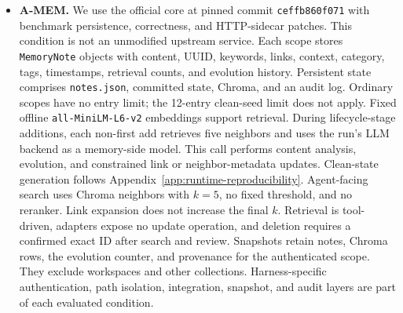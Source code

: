 \documentclass[letterpaper]{article}
\begin{document}
\begin{itemize}
    \item \textbf{A-MEM.} We use the official core at pinned commit \texttt{ceffb860f071} with benchmark persistence, correctness, and HTTP-sidecar patches. This condition is not an unmodified upstream service. Each scope stores \texttt{MemoryNote} objects with content, UUID, keywords, links, context, category, tags, timestamps, retrieval counts, and evolution history. Persistent state comprises \texttt{notes.json}, committed state, Chroma, and an audit log. Ordinary scopes have no entry limit; the 12-entry clean-seed limit does not apply. Fixed offline \texttt{all-MiniLM-L6-v2} embeddings support retrieval. During lifecycle-stage additions, each non-first add retrieves five neighbors and uses the run's LLM backend as a memory-side model. This call performs content analysis, evolution, and constrained link or neighbor-metadata updates. Clean-state generation follows Appendix~\ref{app:runtime-reproducibility}. Agent-facing search uses Chroma neighbors with \(k=5\), no fixed threshold, and no reranker. Link expansion does not increase the final \(k\). Retrieval is tool-driven, adapters expose no update operation, and deletion requires a confirmed exact ID after search and review. Snapshots retain notes, Chroma rows, the evolution counter, and provenance for the authenticated scope. They exclude workspaces and other collections. Harness-specific authentication, path isolation, integration, snapshot, and audit layers are part of each evaluated condition.
\end{itemize}
\end{document}
